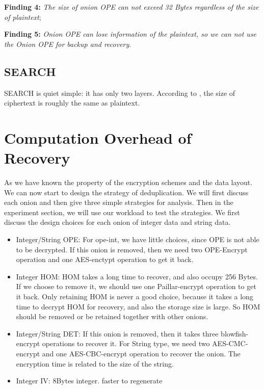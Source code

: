 

\textbf{Finding 4:} \textit{The size of onion OPE can not exceed 32 Bytes regardless of the size of plaintext};

\textbf{Finding 5:} \textit{Onion OPE can lose information of the plaintext, so we can not use the Onion OPE for backup and recovery}.

\subsection{SEARCH}
SEARCH is quiet simple: it has only two layers. According to \citep{song2000practical}, the size of ciphertext is roughly the same as plaintext.

\section{Computation Overhead of Recovery}
As we have known the property of the encryption schemes and the data layout. We can now start to design the strategy of deduplication. We will first discuss each onion and then give three simple strategies for analysis. Then in the experiment section, we will use our workload to test the strategies. We first discuss the design choices for each onion of integer data and string data. 


\begin{itemize}
\item Integer/String OPE: For ope-int, we have little choices, since OPE is not able to be decrypted. If this onion is removed, then we need two OPE-Encrypt operation and one AES-enctypt operation to get it back. 
\item Integer HOM: HOM takes a long time to recover, and also occupy 256 Bytes. If we choose to remove it, we should use one Paillar-encrypt operation to get it back. Only retaining HOM is never a good choice, because it takes a long time to decrypt HOM for recovery, and also the storage size is large. So HOM should be removed or be retained together with other onions.
\item Integer/String DET: If this onion is removed, then it takes three blowfish-encrypt operations to recover it. For String type, we need two AES-CMC-encrypt and one AES-CBC-encrypt operation to recover the onion. The encryption time is related to the size of the string.
\item Integer IV: 8Bytes integer. faster to regenerate
\end{itemize}


